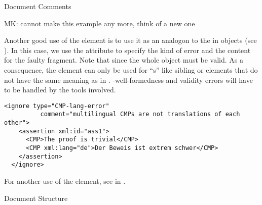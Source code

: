 \begin{omgroup}[id=omdoc-infrastructure,short=Document Infrastructure]
\begin{omgroup}[id=comment]{Document Comments}
\begin{module}[id=comments]
\begin{oldpart}{MK: cannot make this example any more, think of a new one}
\begin{example}
  Another good use of the  element is to use it as an analogon to the
  {} in {\openmath} objects (see {}). In
  this case, we use the  attribute to specify the kind of error
  and the content for the faulty \omdoc fragment. Note that since the whole object must
  be {\xml} valid. As a consequence, the  element can only be used for
  ``{s}'' like sibling  or 
  elements that do not have the same meaning as in
  {}. {\xml}-well-formedness and validity errors will have to be
  handled by the {\xml} tools involved.

\begin{lstlisting}[label=lst:ignore-error,
  caption={Marking up Mathematical Errors Using \element{ignore}},
  numbers=none,index={ignore}]
  <ignore type="CMP-lang-error" 
          comment="multilingual CMPs are not translations of each other">
    <assertion xml:id="ass1">
      <CMP>The proof is trivial</CMP>
      <CMP xml:lang="de">Der Beweis ist extrem schwer</CMP>
    </assertion>
  </ignore>
\end{lstlisting}    
For another use of the  element, see {} in
{}.
\end{example}
\end{oldpart}
\end{module}
\end{omgroup}

\begin{omgroup}[id=sectioning]{Document Structure}
\begin{module}[id=sectioning]


\end{module}
\end{omgroup}
\end{omgroup}
